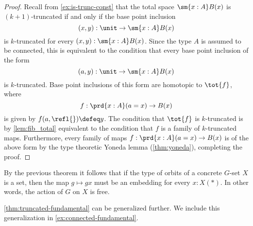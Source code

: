 \begin{proof}
  Recall from \cref{ex:is-trunc-const} that the total space $\sm{x:A}B(x)$ is $(k+1)$-truncated if and only if the base point inclusion
  \begin{equation*}
    (x,y):\unit\to\sm{x:A}B(x)
  \end{equation*}
  is $k$-truncated for every $(x,y):\sm{x:A}B(x)$. Since the type $A$ is assumed to be connected, this is equivalent to the condition that every base point inclusion of the form
  \begin{equation*}
    (a,y):\unit\to\sm{x:A}B(x)
  \end{equation*}
  is $k$-truncated. Base point inclusions of this form are homotopic to $\tot{f}$, where
  \begin{equation*}
    f:\prd{x:A}(a=x)\to B(x)
  \end{equation*}
  is given by $f(a,\refl{})\defeq y$. The condition that $\tot{f}$ is $k$-truncated is by \cref{lem:fib_total} equivalent to the condition that $f$ is a family of $k$-truncated maps. Furthermore, every family of maps $f:\prd{x:A}(a=x)\to B(x)$ is of the above form by the type theoretic Yoneda lemma (\cref{thm:yoneda}), completing the proof. 
\end{proof}

By the previous theorem it follows that if the type of orbits of a concrete $G$-set $X$ is a set, then the map $g\mapsto gx$ must be an embedding for every $x:X(\ast)$. In other words, the action of $G$ on $X$ is free.

\begin{rmk}
  \cref{thm:truncated-fundamental} can be generalized further. We include this generalization in \cref{ex:connected-fundamental}.
\end{rmk}

